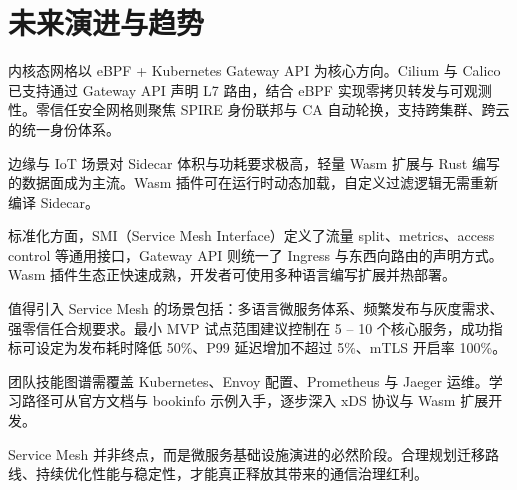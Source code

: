 \chapter{未来演进与趋势}
内核态网格以 eBPF + Kubernetes Gateway API 为核心方向。Cilium 与 Calico 已支持通过 Gateway API 声明 L7 路由，结合 eBPF 实现零拷贝转发与可观测性。零信任安全网格则聚焦 SPIRE 身份联邦与 CA 自动轮换，支持跨集群、跨云的统一身份体系。\par
边缘与 IoT 场景对 Sidecar 体积与功耗要求极高，轻量 Wasm 扩展与 Rust 编写的数据面成为主流。Wasm 插件可在运行时动态加载，自定义过滤逻辑无需重新编译 Sidecar。\par
标准化方面，SMI（Service Mesh Interface）定义了流量 split、metrics、access control 等通用接口，Gateway API 则统一了 Ingress 与东西向路由的声明方式。Wasm 插件生态正快速成熟，开发者可使用多种语言编写扩展并热部署。\par
值得引入 Service Mesh 的场景包括：多语言微服务体系、频繁发布与灰度需求、强零信任合规要求。最小 MVP 试点范围建议控制在 5 – 10 个核心服务，成功指标可设定为发布耗时降低 50\%{}、P99 延迟增加不超过 5\%{}、mTLS 开启率 100\%{}。\par
团队技能图谱需覆盖 Kubernetes、Envoy 配置、Prometheus 与 Jaeger 运维。学习路径可从官方文档与 bookinfo 示例入手，逐步深入 xDS 协议与 Wasm 扩展开发。\par
Service Mesh 并非终点，而是微服务基础设施演进的必然阶段。合理规划迁移路线、持续优化性能与稳定性，才能真正释放其带来的通信治理红利。\par
